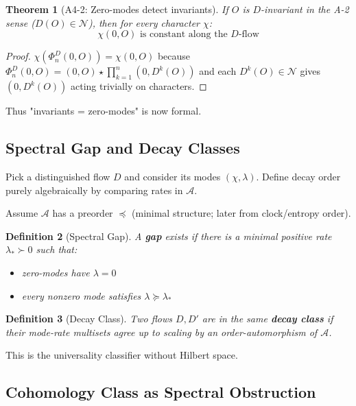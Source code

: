 \documentclass[12pt, oneside]{article}
\newtheorem{theorem}{Theorem}[section]
\newtheorem{definition}[theorem]{Definition}
\newcommand{\N}{\mathcal{N}}
\newcommand{\A}{\mathcal{A}}
\begin{document}
\begin{theorem}[A4-2: Zero-modes detect invariants]
If $O$ is $D$-invariant in the A-2 sense ($D(O) \in \N$), then for every character $\chi$:
\begin{equation}
\chi(0, O) \text{ is constant along the $D$-flow}
\end{equation}
\end{theorem}

\begin{proof}
$\chi(\Phi_n^D(0, O)) = \chi(0, O)$ because $\Phi_n^D(0, O) = (0, O) \star \prod_{k=1}^n (0, D^k(O))$ and each $D^k(O) \in \N$ gives $(0, D^k(O))$ acting trivially on characters.
\end{proof}

Thus "invariants = zero-modes" is now formal.

\subsection{Spectral Gap and Decay Classes}

Pick a distinguished flow $D$ and consider its modes $(\chi, \lambda)$. Define decay order purely algebraically by comparing rates in $\A$.

Assume $\A$ has a preorder $\preceq$ (minimal structure; later from clock/entropy order).

\begin{definition}[Spectral Gap]
A \textbf{gap} exists if there is a minimal positive rate $\lambda_* \succ 0$ such that:
\begin{itemize}
    \item zero-modes have $\lambda = 0$
    \item every nonzero mode satisfies $\lambda \succeq \lambda_*$
\end{itemize}
\end{definition}

\begin{definition}[Decay Class]
Two flows $D, D'$ are in the same \textbf{decay class} if their mode-rate multisets agree up to scaling by an order-automorphism of $\A$.
\end{definition}

This is the universality classifier without Hilbert space.

\subsection{Cohomology Class as Spectral Obstruction}
\end{document}
